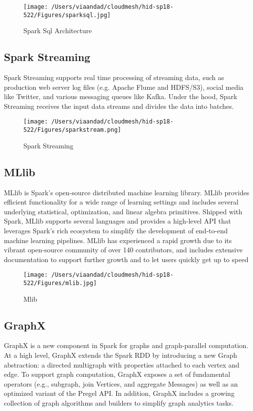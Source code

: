 \documentclass{paper}
\begin{document}
\begin{figure}[H]
	\centering
	\texttt{[image: /Users/viaandad/cloudmesh/hid-sp18-522/Figures/sparksql.jpg]}
	\caption[Optional caption]{Spark Sql Architecture\cite{ref:sql}}
	\label{fig:sparkfeatures}
\end{figure}

\subsection{Spark Streaming}
Spark Streaming supports real time processing of streaming data, such as production web server log files (e.g. Apache Flume and HDFS/S3), social media like Twitter, and various messaging queues like Kafka. Under the hood, Spark Streaming receives the input data streams and divides the data into batches.\cite{ref:topal} \hfill\break

\begin{figure}[H]
	\centering
	\texttt{[image: /Users/viaandad/cloudmesh/hid-sp18-522/Figures/sparkstream.png]}
	\caption[Optional caption]{Spark Streaming  \cite{ref:databricks}}
	\label{fig:sparkfeatures}
\end{figure}

\subsection{MLlib}
MLlib is Spark's open-source distributed machine learning library. MLlib provides efficient functionality for a wide range of learning settings and includes several underlying statistical, optimization, and linear algebra primitives. Shipped with Spark, MLlib supports several languages and provides a high-level API that leverages Spark's rich ecosystem to simplify the development of end-to-end machine learning pipelines. MLlib has experienced a rapid growth due to its vibrant open-source community of over 140 contributors, and includes extensive documentation to support further growth and to let users quickly get up to speed\cite{ref:spark}\hfill\break

\begin{figure}[H]
	\centering
	\texttt{[image: /Users/viaandad/cloudmesh/hid-sp18-522/Figures/mlib.jpg]}
	\caption[Optional caption]{Mlib \cite{ref:databricks}}
	\label{fig:sparkfeatures}
\end{figure}

\subsection{GraphX}
GraphX is a new component in Spark for graphs and graph-parallel computation. At a high level, GraphX extends the Spark RDD by introducing a new Graph abstraction: a directed multigraph with properties attached to each vertex and edge. To support graph computation, GraphX exposes a set of fundamental operators (e.g., subgraph, join Vertices, and aggregate Messages) as well as an optimized variant of the Pregel API. In addition, GraphX includes a growing collection of graph algorithms and builders to simplify graph analytics tasks.\cite{ref:graphx}\hfill\break
\end{document}
